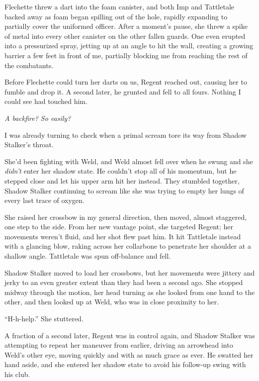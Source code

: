 Flechette threw a dart into the foam canister, and both Imp and Tattletale backed away as foam began spilling out of the hole, rapidly expanding to partially cover the uniformed officer.  After a moment's pause, she threw a spike of metal into every other canister on the other fallen guards.  One even erupted into a pressurized spray, jetting up at an angle to hit the wall, creating a growing barrier a few feet in front of me, partially blocking me from reaching the rest of the combatants.



Before Flechette could turn her darts on us, Regent reached out, causing her to fumble and drop it.  A second later, he grunted and fell to all fours.  Nothing I could see had touched him.



\emph{A backfire?  So easily?}



I was already turning to check when a primal scream tore its way from Shadow Stalker's throat.



She'd been fighting with Weld, and Weld almost fell over when he swung and she \emph{didn't} enter her shadow state.  He couldn't stop all of his momentum, but he stepped close and let his upper arm hit her instead.  They stumbled together, Shadow Stalker continuing to scream like she was trying to empty her lungs of every last trace of oxygen.



She raised her crossbow in my general direction, then moved, almost staggered, one step to the side.  From her new vantage point, she targeted Regent; her movements weren't fluid, and her shot flew past him.  It hit Tattletale instead with a glancing blow, raking across her collarbone to penetrate her shoulder at a shallow angle.  Tattletale was spun off-balance and fell.



Shadow Stalker moved to load her crossbows, but her movements were jittery and jerky to an even greater extent than they had been a second ago.  She stopped midway through the motion, her head turning as she looked from one hand to the other, and then looked up at Weld, who was in close proximity to her.



``H-h-help.''  She stuttered.



A fraction of a second later, Regent was in control again, and Shadow Stalker was attempting to repeat her maneuver from earlier, driving an arrowhead into Weld's other eye, moving quickly and with as much grace as ever.  He swatted her hand aside, and she entered her shadow state to avoid his follow-up swing with his club.



